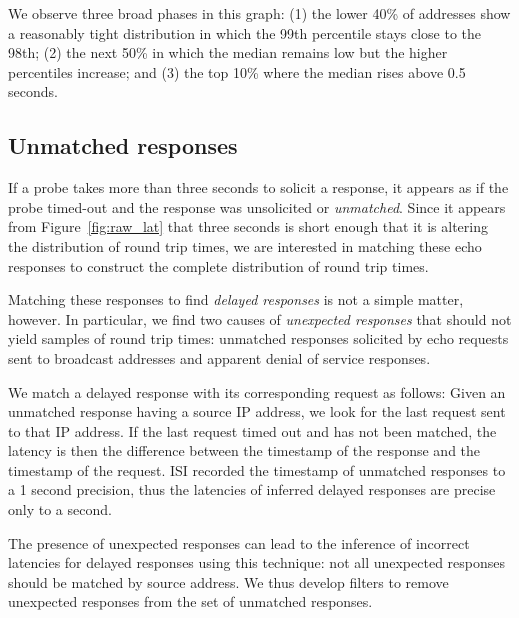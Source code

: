 We observe three broad phases in this graph: (1) the lower
40\% of addresses show a reasonably tight distribution in
which the 99th percentile stays close to the 98th; (2) the
next 50\% in which the median remains low but the higher
percentiles increase; and (3) the top 10\% where the median
rises above 0.5 seconds.


\subsection{Unmatched responses}

If a probe takes more than three seconds to solicit a
response, it appears as if the probe timed-out and the
response was unsolicited or \emph{unmatched}.  Since it
appears from Figure~\ref{fig:raw_lat} that three seconds is
short enough that it is altering the distribution of round
trip times, we are interested in matching these echo
responses to construct the complete distribution of round
trip times.

Matching these responses to find \emph{delayed responses} is
not a simple matter, however.  In particular, we find two
causes of \emph{unexpected responses} that should not yield
samples of round trip times: unmatched responses solicited
by echo requests sent to broadcast addresses and apparent
denial of service responses.


We match a delayed response with its corresponding request
as follows: Given an unmatched response having a source IP
address, we look for the last request sent to that IP
address.  If the last request timed out and has not been matched, the latency is then the difference between the
timestamp of the response and the timestamp of the
request.  ISI recorded the timestamp of unmatched responses
to a 1 second precision, thus the latencies of inferred
delayed responses are precise only to a second.

The presence of unexpected responses can lead to the
inference of incorrect latencies for delayed responses using
this technique: not all unexpected responses should be
matched by source address.
We thus develop filters to remove unexpected responses from the set of
unmatched responses.

